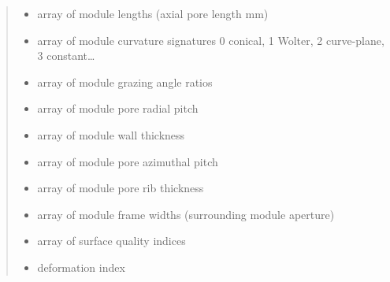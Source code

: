 \documentclass[letterpaper,10pt,english]{sphinxmanual}
\begin{document}
\begin{fulllineitems}
\begin{quote}
\begin{description}
\begin{itemize}
\item {} 
 \textendash{} array of module lengths (axial pore length mm)

\item {} 
 \textendash{} array of module curvature signatures
0 conical, 1 Wolter, 2 curve-plane, 3 constant…

\item {} 
 \textendash{} array of module grazing angle ratios

\item {} 
 \textendash{} array of module pore radial pitch

\item {} 
 \textendash{} array of module wall thickness

\item {} 
 \textendash{} array of module pore azimuthal pitch

\item {} 
 \textendash{} array of module pore rib thickness

\item {} 
 \textendash{} array of module frame widths (surrounding module aperture)

\item {} 
 \textendash{} array of surface quality indices

\item {} 
 \textendash{} deformation index

\end{itemize}


\end{description}
\end{quote}
\end{fulllineitems}
\end{document}
